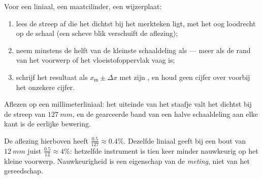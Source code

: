 \begin{method}\label{met:g10:orders-of-magnitude:reading}
Voor een liniaal, een maatcilinder, een wijzerplaat:
\begin{enumerate}
  \item lees de streep af die het dichtst bij het merkteken ligt, met
        het oog loodrecht op de schaal (een scheve blik verschuift de
        aflezing);
  \item neem minstens de helft van de kleinste schaaldeling als
         --- meer als de rand van het voorwerp of
        het vloeistofoppervlak vaag is;
  \item schrijf het resultaat als $x_{\text{m}} \pm \Delta x$ met zijn
        , en houd geen cijfer over voorbij het onzekere cijfer.
\end{enumerate}
\end{method}

\begin{omfigure}

{\small Aflezen op een millimeterliniaal: het uiteinde van het staafje
valt het dichtst bij de streep van $\qty{127}{mm}$, en de gearceerde
band van een halve schaaldeling aan elke kant is de eerlijke bewering.}
\end{omfigure}

\begin{example}\label{ex:g10:orders-of-magnitude:reading}
De aflezing hierboven heeft 
$\frac{0.5}{127} \approx 0.4\%$. Dezelfde liniaal geeft bij een bout
van $\qty{12}{mm}$ juist $\frac{0.5}{12} \approx 4\%$: hetzelfde
instrument is tien keer minder nauwkeurig op het kleine voorwerp.
Nauwkeurigheid is een eigenschap van de \emph{meting}, niet van het
gereedschap.
\end{example}

